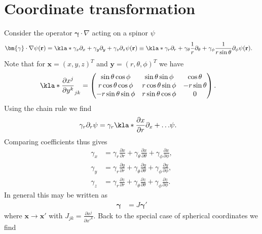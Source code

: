 \documentclass[english, parskip=full]{scrartcl}
\begin{document}
\section{Coordinate transformation}
Consider the operator $\bm{\gamma} \cdot \nabla$ acting on a spinor $\psi$
\begin{align}
\bm{\gamma} \cdot \nabla\psi(\textbf{r}) &= \kla*{\gamma_x \partial_x + \gamma_y\partial_y + \gamma_z \partial_z} \psi(\textbf{r}) \equiv \kla*{\gamma_r\partial_r + \gamma_\theta \frac{1}{r} \partial_\theta + \gamma_\phi \frac{1}{r\sin\theta} \partial_\phi}\psi(\textbf{r}).
\end{align}
Note that for $\textbf{x} = (x,y,z)^T$ and $\textbf{y} = (r,\theta,\phi)^T$ we have
\begin{align}
\kla*{\frac{\partial x^j}{\partial y^k}}_{jk} &= \begin{pmatrix}
\sin\theta\cos\phi & \sin\theta\sin\phi & \cos\theta \\
r\cos\theta\cos\phi & r\cos\theta\sin\phi & -r\sin\theta \\
-r\sin\theta\sin\phi & r\sin\theta\cos\phi & 0
\end{pmatrix}.
\end{align}
Using the chain rule we find
\begin{align}
\gamma_r\partial_r \psi &= \gamma_r \kla*{\frac{\partial x}{\partial r} \partial_x + \dots}\psi.
\end{align}
Comparing coefficients thus gives
\begin{align}
\gamma_x &= \gamma_r \frac{\partial x}{\partial r} + \gamma_\theta \frac{\partial x}{\partial \theta} + \gamma_\phi \frac{\partial x}{\partial \phi} ,\\
\gamma_y &= \gamma_r \frac{\partial y}{\partial r} + \gamma_\theta \frac{\partial y}{\partial \theta} + \gamma_\phi \frac{\partial y}{\partial \phi} ,\\
\gamma_z &= \gamma_r \frac{\partial z}{\partial r} + \gamma_\theta \frac{\partial z}{\partial \theta} + \gamma_\phi \frac{\partial z}{\partial \phi} .
\end{align}
In general this may be written as
\begin{align}
\bm{\gamma} &= J \bm{\gamma}'
\end{align}
where $\textbf{x} \rightarrow \textbf{x}'$ with $J_{jk} = \frac{\partial x^j}{\partial x'^k}$.
Back to the special case of spherical coordinates we find
\end{document}
